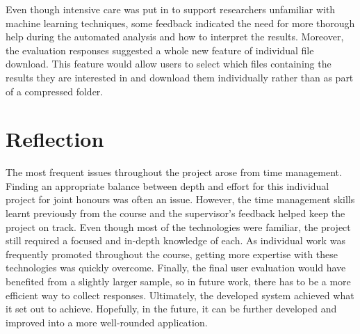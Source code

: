 \documentclass{l4proj}
\begin{document}
Even though intensive care was put in to support researchers unfamiliar with machine learning techniques, some feedback indicated the need for more thorough help during the automated analysis and how to interpret the results. Moreover, the evaluation responses suggested a whole new feature of individual file download. This feature would allow users to select which files containing the results they are interested in and download them individually rather than as part of a compressed folder. 

\section{Reflection}
The most frequent issues throughout the project arose from time management. Finding an appropriate balance between depth and effort for this individual project for joint honours was often an issue. However, the time management skills learnt previously from the course and the supervisor's feedback helped keep the project on track. Even though most of the technologies were familiar, the project still required a focused and in-depth knowledge of each. As individual work was frequently promoted throughout the course, getting more expertise with these technologies was quickly overcome. Finally, the final user evaluation would have benefited from a slightly larger sample, so in future work, there has to be a more efficient way to collect responses. Ultimately, the developed system achieved what it set out to achieve. Hopefully, in the future, it can be further developed and improved into a more well-rounded application. 
\end{document}
